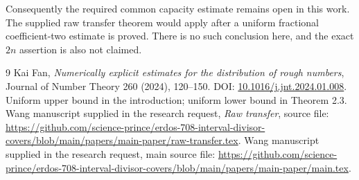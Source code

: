 \documentclass[11pt,a4paper]{article}
\begin{document}
Consequently the required common capacity estimate remains open in
this work. The supplied raw transfer theorem would apply after a
uniform fractional coefficient-two estimate is proved. There is no
such conclusion here, and the exact $2n$ assertion is also not claimed.

\begin{thebibliography}{9}
 Kai Fan, \emph{Numerically explicit estimates for the
distribution of rough numbers}, Journal of Number Theory 260 (2024),
120--150. DOI: \href{https://doi.org/10.1016/j.jnt.2024.01.008}{10.1016/j.jnt.2024.01.008}.
Uniform upper bound in the introduction; uniform lower bound in Theorem 2.3.
 Wang manuscript supplied in the research request,
\emph{Raw transfer}, source file:
\url{https://github.com/science-prince/erdos-708-interval-divisor-covers/blob/main/papers/main-paper/raw-transfer.tex}.
 Wang manuscript supplied in the research request,
main source file:
\url{https://github.com/science-prince/erdos-708-interval-divisor-covers/blob/main/papers/main-paper/main.tex}.
\end{thebibliography}
\end{document}
